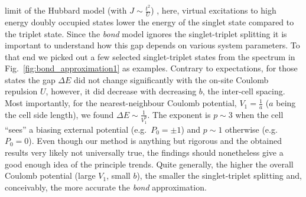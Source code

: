 limit of the Hubbard model (with $J \sim \frac{t^2}{U}$) \cite{Auerbach}, here,
virtual excitations to high energy doubly occupied states lower the energy of
the singlet state compared to the triplet state. Since the \emph{bond} model
ignores the singlet-triplet splitting it is important to understand how this gap
depends on various system parameters. To that end we picked out a few
selected singlet-triplet states from the spectrum in
Fig.~\ref{fig:bond_approximation1} as examples. Contrary to expectations, for
those states the gap $\Delta E$ did not change significantly with the on-site
Coulomb repulsion $U$, however, it did decrease with decreasing $b$, the
inter-cell spacing. Most importantly, for the nearest-neighbour Coulomb
potential, $V_1 = \frac{1}{a}$ ($a$ being the cell side length), we found
$\Delta E \sim \frac{1}{V_1^p}$. The exponent is $p \sim 3$ when the cell
``sees'' a biasing external potential (e.g.\ $P_0 = \pm 1$) and $p \sim 1$
otherwise (e.g.\ $P_0 = 0$). Even though our method is anything but rigorous and
the obtained results very likely not universally true, the findings should
nonetheless give a good enough idea of the principle trends. Quite generally,
the higher the overall Coulomb potential (large $V_1$, small $b$), the smaller
the singlet-triplet splitting and, conceivably, the more accurate the
\emph{bond} approximation.

